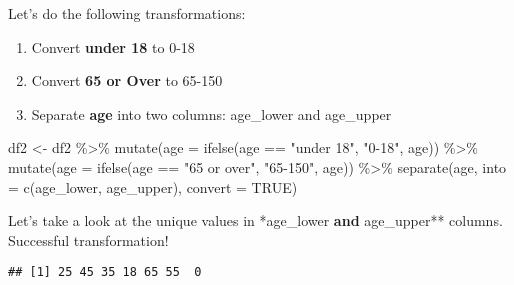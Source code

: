 \documentclass[
]{article}
\newenvironment{Shaded}{\begin{snugshade}}{\end{snugshade}}
\newcommand{\AttributeTok}[1]{\textcolor[rgb]{0.77,0.63,0.00}{#1}}
\newcommand{\ConstantTok}[1]{\textcolor[rgb]{0.00,0.00,0.00}{#1}}
\newcommand{\FunctionTok}[1]{\textcolor[rgb]{0.00,0.00,0.00}{#1}}
\newcommand{\NormalTok}[1]{#1}
\newcommand{\OtherTok}[1]{\textcolor[rgb]{0.56,0.35,0.01}{#1}}
\newcommand{\SpecialCharTok}[1]{\textcolor[rgb]{0.00,0.00,0.00}{#1}}
\newcommand{\StringTok}[1]{\textcolor[rgb]{0.31,0.60,0.02}{#1}}
\providecommand{\tightlist}{%
  \setlength{\itemsep}{0pt}\setlength{\parskip}{0pt}}
\begin{document}
Let's do the following transformations:

\begin{enumerate}
\def\labelenumi{\arabic{enumi}.}
\tightlist
\item
  Convert \textbf{under 18} to 0-18
\item
  Convert \textbf{65 or Over} to 65-150
\item
  Separate \textbf{age} into two columns: age\_lower and age\_upper
\end{enumerate}

\begin{Shaded}
\begin{Highlighting}[]
\NormalTok{df2 }\OtherTok{\textless{}{-}}\NormalTok{ df2 }\SpecialCharTok{\%\textgreater{}\%}
        \FunctionTok{mutate}\NormalTok{(}\AttributeTok{age =} \FunctionTok{ifelse}\NormalTok{(age }\SpecialCharTok{==} \StringTok{"under 18"}\NormalTok{, }\StringTok{"0{-}18"}\NormalTok{, age)) }\SpecialCharTok{\%\textgreater{}\%}
        \FunctionTok{mutate}\NormalTok{(}\AttributeTok{age =} \FunctionTok{ifelse}\NormalTok{(age }\SpecialCharTok{==} \StringTok{"65 or over"}\NormalTok{, }\StringTok{"65{-}150"}\NormalTok{, age)) }\SpecialCharTok{\%\textgreater{}\%}
        \FunctionTok{separate}\NormalTok{(age, }\AttributeTok{into =} \FunctionTok{c}\NormalTok{(}\StringTok{\textquotesingle{}age\_lower\textquotesingle{}}\NormalTok{, }\StringTok{\textquotesingle{}age\_upper\textquotesingle{}}\NormalTok{), }\AttributeTok{convert =} \ConstantTok{TRUE}\NormalTok{)}
\end{Highlighting}
\end{Shaded}

Let's take a look at the unique values in *age\_lower\textbf{ and
}age\_upper** columns. Successful transformation!

\begin{Shaded}
\end{Shaded}

\begin{verbatim}
## [1] 25 45 35 18 65 55  0
\end{verbatim}

\begin{Shaded}
\end{Shaded}
\end{document}
